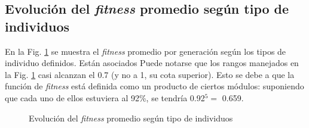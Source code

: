 \documentclass{article}
\begin{document}
\subsection{Evoluci\'on del \textit{fitness} promedio seg\'un tipo de individuos}
En la Fig. \ref{fig:resultados_fitness} se muestra el \textit{fitness} promedio por generaci\'on seg\'un los tipos de individuo definidos. Est\'an asociados 
Puede notarse que los rangos manejados en la Fig. \ref{fig:resultados_fitness} casi alcanzan el 0.7 (y no a 1, su cota superior). Esto se debe a que la funci\'on de \textit{fitness} est\'a definida como un producto de ciertos m\'odulos: suponiendo que cada uno de ellos estuviera al 92\%, se tendr\'ia  0.92$^5 =$ 0.659.
\begin{figure}[H]%
  \centering
  \caption{Evoluci\'on del \textit{fitness} promedio seg\'un tipo de individuos}%
  \label{fig:resultados_fitness} %
\end{figure}
\end{document}
